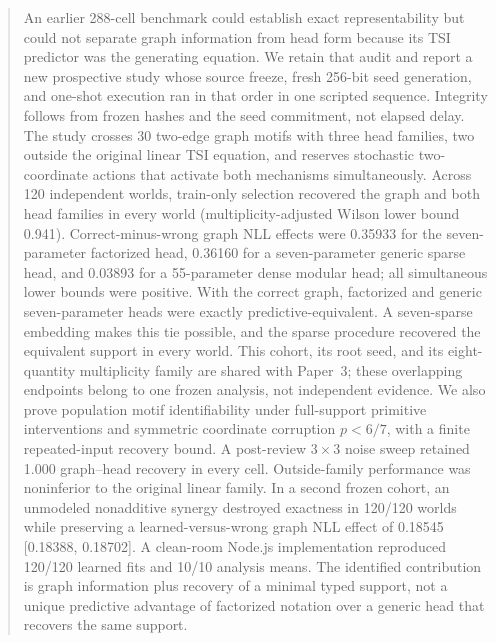 \begin{abstract}
An earlier 288-cell benchmark could establish exact representability but could
not separate graph information from head form because its TSI predictor was the
generating equation.  We retain that audit and report a new prospective study
whose source freeze, fresh 256-bit seed generation, and one-shot execution ran
in that order in one scripted sequence.  Integrity follows from frozen hashes
and the seed commitment, not elapsed delay.  The study crosses 30 two-edge graph
motifs with three head families, two outside the original linear TSI equation,
and reserves stochastic two-coordinate actions that activate both mechanisms
simultaneously.  Across
120 independent worlds, train-only selection recovered the graph and both head
families in every world (multiplicity-adjusted Wilson lower bound 0.941).
Correct-minus-wrong graph NLL effects were 0.35933 for the seven-parameter
factorized head, 0.36160 for a seven-parameter generic sparse head, and 0.03893
for a 55-parameter dense modular head; all simultaneous lower bounds were
positive.  With the correct graph, factorized and generic seven-parameter heads
were exactly predictive-equivalent.  A seven-sparse embedding makes this tie
possible, and the sparse procedure recovered the equivalent support in every
world.  This cohort, its root seed, and its eight-quantity multiplicity family
are shared with Paper~3; these overlapping endpoints belong to one frozen
analysis, not independent evidence.  We also prove population motif
identifiability under full-support primitive interventions and symmetric
coordinate corruption \(p<6/7\), with a finite repeated-input recovery bound.
A post-review \(3\times3\) noise sweep retained 1.000 graph--head recovery in
every cell.  Outside-family performance was noninferior
to the original linear family.  In a second frozen cohort, an unmodeled nonadditive synergy destroyed
exactness in 120/120 worlds while preserving a learned-versus-wrong graph NLL
effect of 0.18545 [0.18388, 0.18702].  A clean-room Node.js implementation reproduced 120/120 learned
fits and 10/10 analysis means.  The identified contribution is graph
information plus recovery of a minimal typed support, not a unique predictive
advantage of factorized notation over a generic head that recovers the same
support.
\end{abstract}
